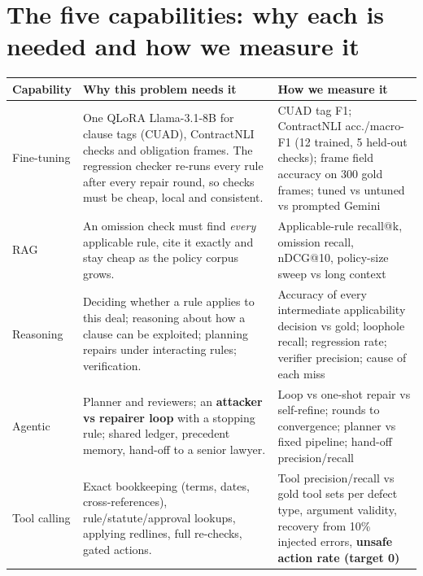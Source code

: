 \documentclass[11pt,a4paper]{article}
\begin{document}
\section{The five capabilities: why each is needed and how we measure it}
\begin{table}[H]\small
\begin{tabularx}{\textwidth}{@{}p{2.1cm}LL@{}}
\toprule
\textbf{Capability} & \textbf{Why this problem needs it} & \textbf{How we measure it} \\
\midrule
Fine-tuning & One QLoRA Llama-3.1-8B for clause tags (CUAD), ContractNLI checks and obligation frames. The regression checker re-runs every rule after every repair round, so checks must be cheap, local and consistent. & CUAD tag F1; ContractNLI acc./macro-F1 (12 trained, 5 held-out checks); frame field accuracy on 300 gold frames; tuned vs untuned vs prompted Gemini \\
RAG & An omission check must find \emph{every} applicable rule, cite it exactly and stay cheap as the policy corpus grows. & Applicable-rule recall@k, omission recall, nDCG@10, policy-size sweep vs long context \\
Reasoning & Deciding whether a rule applies to this deal; reasoning about how a clause can be exploited; planning repairs under interacting rules; verification. & Accuracy of every intermediate applicability decision vs gold; loophole recall; regression rate; verifier precision; cause of each miss \\
Agentic & Planner and reviewers; an \textbf{attacker vs repairer loop} with a stopping rule; shared ledger, precedent memory, hand-off to a senior lawyer. & Loop vs one-shot repair vs self-refine; rounds to convergence; planner vs fixed pipeline; hand-off precision/recall \\
Tool calling & Exact bookkeeping (terms, dates, cross-references), rule/statute/approval lookups, applying redlines, full re-checks, gated actions. & Tool precision/recall vs gold tool sets per defect type, argument validity, recovery from 10\% injected errors, \textbf{unsafe action rate (target 0)} \\
\bottomrule
\end{tabularx}
\end{table}

\end{document}
